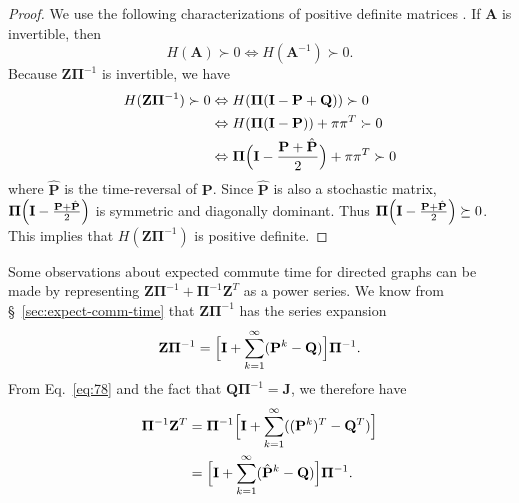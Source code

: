 \begin{proof}
  We use the
  following characterizations of positive definite matrices
  \citep[see][\S
  1.2]{boley09:_gener_laplac,horn94:_topic_in_matrix_analy}. If
  $\mathbf{A}$ is invertible, then
  \begin{equation}
    \label{eq:74}
    H(\mathbf{A}) \succ 0 \Leftrightarrow
    H(\mathbf{A}^{-1}) \succ 0.
  \end{equation}
  Because $\mathbf{Z}\bm{\Pi}^{-1}$ is invertible, we have
  \begin{equation}
    \label{eq:75}
    \begin{split}
      H(\mathbf{Z}\bm{\Pi}^{-1}) \succ 0 & \Leftrightarrow
      H(\bm{\Pi}(\mathbf{I} - \mathbf{P} +
      \mathbf{Q})) \succ 0  \\
      & \Leftrightarrow H(\bm{\Pi}(\mathbf{I} - \mathbf{P})) + \pi \pi^{T} \succ 0 \\
      & \Leftrightarrow \bm{\Pi}\Bigl(\mathbf{I} - \frac{\mathbf{P}
        + \hat{\mathbf{P}}}{2}\Bigr) + \pi\pi^{T} \succ 0
    \end{split}
  \end{equation}
  where $\hat{\mathbf{P}}$ is the time-reversal of $\mathbf{P}$. Since
  $\hat{\mathbf{P}}$ is also a stochastic matrix,
  $\bm{\Pi}\Bigl(\mathbf{I} - \tfrac{\mathbf{P} +
    \hat{\mathbf{P}}}{2}\Bigr)$ is symmetric and diagonally dominant. Thus
  $\bm{\Pi}\Bigl(\mathbf{I} - \tfrac{\mathbf{P} +
    \hat{\mathbf{P}}}{2}\Bigr) \succeq 0$. This implies that
  $H(\mathbf{Z}\bm{\Pi}^{-1})$ is positive
  definite. 
\end{proof}
Some observations about expected commute time for directed graphs can
be made by representing $\mathbf{Z}\bm{\Pi}^{-1} +
\bm{\Pi}^{-1}\mathbf{Z}^{T}$ as a power series. We know from \S~\ref{sec:expect-comm-time} that $\mathbf{Z}\bm{\Pi}^{-1}$ has the
series expansion
\begin{equation*}
  \mathbf{Z}\bm{\Pi}^{-1} = \Bigl[ \mathbf{I} +
  \sum_{k=1}^{\infty}(\mathbf{P}^{k} - \mathbf{Q})\Bigr] \bm{\Pi}^{-1}.
\end{equation*}
From Eq.~\eqref{eq:78} and the fact that $\mathbf{Q}\bm{\Pi}^{-1} =
\mathbf{J}$, we therefore have 
\begin{equation*}
  \begin{split}
    \bm{\Pi}^{-1} \mathbf{Z}^{T} &= \bm{\Pi}^{-1} \Bigl[ \mathbf{I} +
    \sum_{k=1}^{\infty}((\mathbf{P}^{k})^{T} - \mathbf{Q}^{T})\Bigr] \\
    &= \Bigl[ \mathbf{I} +
    \sum_{k=1}^{\infty}(\hat{\mathbf{P}}^{k} - \mathbf{Q})\Bigr]
    \bm{\Pi}^{-1}.
  \end{split}
\end{equation*}

